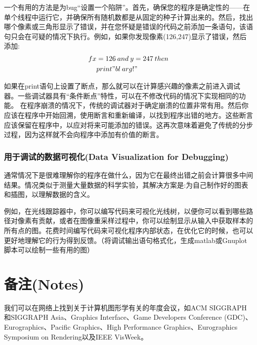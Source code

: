 一个有用的方法是为bug“设置一个陷阱”。首先，确保您的程序是确定性的——在单个线程中运行它，并确保所有随机数都是从固定的种子计算出来的。然后，找出哪个像素或三角形显示了错误，并在您怀疑是错误的代码之前添加一条语句，该语句只会在可疑的情况下执行。例如，如果你发现像素(126,247)显示了错误，然后添加:
\begin{equation}
	\begin{aligned}	
		fx &= 126\:and\:y=247\:then \\
		&print"bl\:arg!"
	\end{aligned}
\end{equation}

如果在print语句上设置了断点，那么就可以在计算感兴趣的像素之前进入调试器。一些调试器具有“条件断点”特性，可以在不修改代码的情况下实现相同的功能。
在程序崩溃的情况下，传统的调试器对于确定崩溃的位置非常有用。然后你应该在程序中开始回溯，使用断言和重新编译，以找到程序出错的地方。这些断言应该保留在程序中，以应对将来可能添加的错误。这再次意味着避免了传统的分步过程，因为这样就不会向程序中添加有价值的断言。

\subsubsection*{\textcolor{structure3}{用于调试的数据可视化(Data Visualization for Debugging)}}

通常情况下是很难理解你的程序在做什么，因为它在最终出错之前会计算很多中间结果。情况类似于测量大量数据的科学实验，其解决方案是:为自己制作好的图表和插图，以理解数据的含义。

例如，在光线跟踪器中，你可以编写代码来可视化光线树，以便你可以看到哪些路径对像素有贡献，或者在图像重采样过程中，你可以绘制显示从输入中获取样本的所有点的图。花费时间编写代码来可视化程序内部状态，在优化它的时候，也可以更好地理解它的行为得到反馈。（将调试输出语句格式化，生成matlab或Gnuplot脚本可以绘制一些有用的图）

\section*{备注(Notes)}

我们可以在网络上找到关于计算机图形学有关的年度会议，如ACM SIGGRAPH和SIGGRAPH Asia、Graphics Interface、Game Developers Conference (GDC)、Eurographics、Pacific Graphics、High Performance Graphics、Eurographics Symposium on Rendering以及IEEE VisWeek。



